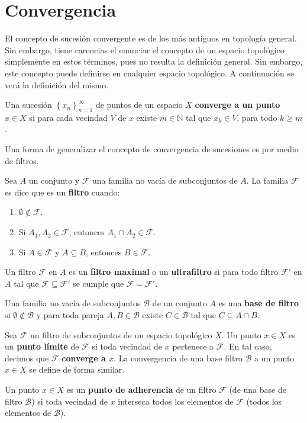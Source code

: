 \documentclass[12pt]{report}
\theoremstyle{largebreak}
\begin{document}
    \section{Convergencia}

    El concepto de sucesión convergente es de los más antiguos en topología general. Sin embargo, tiene carencias el enunciar el concepto de un espacio topológico simplemente en estos términos, pues no resulta la definición general. Sin embargo, este concepto puede definirse en cualquier espacio topológico. A continuación se verá la definición del mismo.

    \begin{mydef}
        Una sucesión $\left\{x_n\right\}_{n=1}^{\infty}$ de puntos de un espacio $X$ \textbf{converge a un punto $x\in X$} si para cada vecindad $V$ de $x$ existe $m\in\mathbb{N}$ tal que $x_k\in V$, para todo $k\geq m$.
    \end{mydef}

    Una forma de generalizar el concepto de convergencia de sucesiones es por medio de filtros.

    \begin{mydef}
        Sea $A$ un conjunto y $\mathcal{F}$ una familia no vacía de subconjuntos de $A$. La familia $\mathcal{F}$ es dice que es un \textbf{filtro} cuando:
        \begin{enumerate}
            \item $\emptyset\notin\mathcal{F}$.
            \item Si $A_1,A_2\in\mathcal{F}$, entonces $A_1\cap A_2\in\mathcal{F}$.
            \item Si $A\in\mathcal{F}$ y $A\subseteq B$, entonces $B\in\mathcal{F}$.
        \end{enumerate}
        Un filtro $\mathcal{F}$ en $A$ es un \textbf{filtro maximal} o un \textbf{ultrafiltro} si para todo filtro $\mathcal{F}'$ en $A$ tal que $\mathcal{F}\subseteq\mathcal{F}'$ se cumple que $\mathcal{F}=\mathcal{F}'$.

        Una familia no vacía de subconjuntos $\mathcal{B}$ de un conjunto $A$ es una \textbf{base de filtro} si $\emptyset\notin\mathcal{B}$ y para toda pareja $A,B\in\mathcal{B}$ existe $C\in\mathcal{B}$ tal que $C\subseteq A\cap B$.
    \end{mydef}

    \begin{mydef}
        Sea $\mathcal{F}$ un filtro de subconjuntos de un espacio topológico $X$. Un punto $x\in X$ es un \textbf{punto límite} de $\mathcal{F}$ si toda vecindad de $x$ pertenece a $\mathcal{F}$. En tal caso, decimos que $\mathcal{F}$ \textbf{converge a $x$}. La convergencia de una base filtro $\mathcal{B}$ a un punto $x\in X$ se define de forma similar.

        Un punto $x\in X$ es un \textbf{punto de adherencia} de un filtro $\mathcal{F}$ (de una base de filtro $\mathcal{B}$) si toda vecindad de $x$ interseca todos los elementos de $\mathcal{F}$ (todos los elementos de $\mathcal{B}$).
    \end{mydef}
\end{document}
